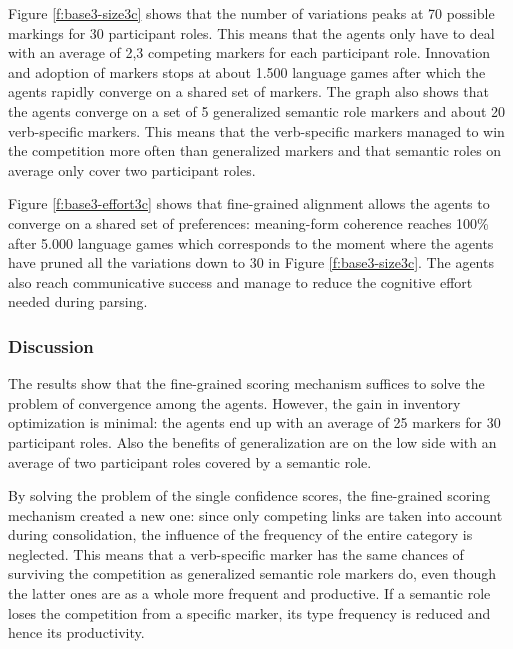 Figure \ref{f:base3-size3c} shows that the number of variations peaks at 70 possible markings for 30 participant roles. This means that the agents only have to deal with an average of 2,3 competing markers for each participant role. Innovation and adoption of markers stops at about 1.500 language games after which the agents rapidly converge on a shared set of markers. The graph also shows that the agents converge on a set of 5 generalized semantic role markers and about 20 verb-specific markers. This means that the verb-specific markers managed to win the competition more often than generalized markers and that semantic roles on average only cover two participant roles.

Figure \ref{f:base3-effort3c} shows that fine-grained alignment allows the agents to converge on a shared set of preferences: meaning-form coherence reaches 100\% after 5.000 language games which corresponds to the moment where the agents have pruned all the variations down to 30 in Figure \ref{f:base3-size3c}. The agents also reach communicative success and manage to reduce the cognitive effort needed during parsing.


\subsubsection{Discussion}
 The results show that the fine-grained scoring mechanism suffices to solve the problem of convergence among the agents. However, the gain in inventory optimization is minimal: the agents end up with an average of 25 markers for 30 participant roles. Also the benefits of generalization are on the low side with an average of two participant roles covered by a semantic role.

By solving the problem of the single confidence scores, the fine-grained scoring mechanism created a new one: since only competing links are taken into account during consolidation, the influence of the frequency of the entire category is neglected. This means that a verb-specific marker has the same chances of surviving the competition as generalized semantic role markers do, even though the latter ones are as a whole more frequent and productive. If a semantic role loses the competition from a specific marker, its type frequency is reduced and hence its productivity.

